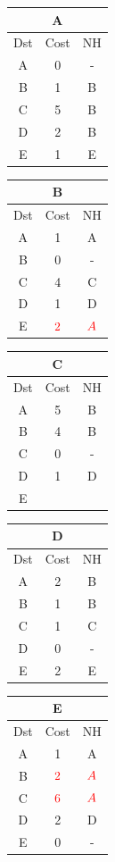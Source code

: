 \documentclass[10pt]{article}
\begin{document}
	\begin{table}[h!]
		\begin{tabular}{|c||c||c|}
 			\hline
	 		\multicolumn{3}{|c|}{A} \\
 			\hline
 			Dst & Cost & NH\\
 			\hline
 			A & 0 & - \\
 			B & 1 & B \\
 			C & 5 & B \\
 			D & 2 & B \\
 			E & 1 & E \\
 			\hline
		\end{tabular}
		\begin{tabular}{|c||c||c|}
 			\hline
	 		\multicolumn{3}{|c|}{B} \\
 			\hline
 			Dst & Cost & NH\\
 			\hline
 			A & 1 & A \\
 			B & 0 & - \\
 			C & 4 & C  \\
 			D & 1 & D \\
 			E & $\color{red} 2$ & $\color{red} A$ \\
 			\hline
		\end{tabular}
		\begin{tabular}{|c||c||c|}
 			\hline
	 		\multicolumn{3}{|c|}{C} \\
 			\hline
 			Dst & Cost & NH\\
 			\hline
 			A & 5 & B \\
 			B & 4 & B \\
 			C & 0 & - \\
 			D & 1 & D \\
 			E &   &   \\
 			\hline
		\end{tabular}
		\begin{tabular}{|c||c||c|}
 			\hline
	 		\multicolumn{3}{|c|}{D} \\
 			\hline
 			Dst & Cost & NH\\
 			\hline
 			A & 2 & B \\
 			B & 1 & B \\
 			C & 1 & C \\
 			D & 0 & - \\
 			E & 2 & E \\
 			\hline
		\end{tabular}
		\begin{tabular}{|c||c||c|}
 			\hline
	 		\multicolumn{3}{|c|}{E} \\
 			\hline
 			Dst & Cost & NH\\
 			\hline
 			A & 1 & A \\
 			B & $\color{red} 2$ & $\color{red} A$ \\
 			C & $\color{red} 6$ & $\color{red} A$ \\
 			D & 2 & D \\
 			E & 0 & - \\
 			\hline
		\end{tabular}
	\end{table}
\end{document}
